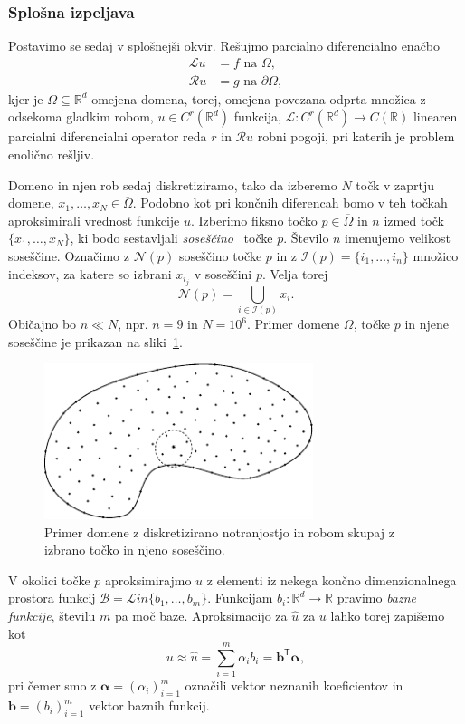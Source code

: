 \documentclass[12pt,a4paper]{article}
\theoremstyle{definition} %
\theoremstyle{plain} %
\newcommand{\R}{\mathbb R}
\newcommand{\Rc}{\mathcal{R}}
\newcommand{\Nc}{\mathcal{N}}
\newcommand{\I}{\mathcal{I}}
\newcommand{\B}{\mathcal{B}}
\renewcommand{\L}{\mathcal{L}}
\newcommand{\T}{\mathsf{T}}
\renewcommand{\b}{\boldsymbol}
\newcommand{\zomega}{\overline{\Omega}}
\newcommand{\Lin}{\mathcal{L}in}
\newcommand{\uh}{\hat{u}}
\newcommand{\ang}[1]{\text{(\textit{angl.} #1)}}
\begin{document}
\subsubsection{Splošna izpeljava}
\label{sec:splosna-izpeljava}
Postavimo se sedaj v splošnejši okvir.
Rešujmo parcialno diferencialno enačbo
\begin{align}
  \L u &= f \text{ na } \Omega, \label{eq:general-problem} \\
  \Rc u &= g \text{ na } \partial \Omega \nonumber,
\end{align}
kjer je $\Omega \subseteq \R^d$ omejena domena, torej, omejena povezana odprta
množica z odsekoma gladkim robom, $u \in C^r(\R^d)$ funkcija,
$\L\colon C^r(\R^d) \to C(\R)$ linearen
parcialni diferencialni operator reda $r$ in $\Rc u$ robni pogoji,
pri katerih je problem enolično rešljiv.

Domeno in njen rob sedaj diskretiziramo, tako da izberemo $N$ točk v zaprtju
domene, $x_1, \dots, x_N \in \zomega$. Podobno kot pri končnih
diferencah bomo v teh točkah aproksimirali vrednost funkcije $u$.
Izberimo fiksno točko $p \in \zomega$ in $n$ izmed točk $\{x_1, \dots, x_N\}$,
ki bodo sestavljali \emph{soseščino}~\ang{support} točke $p$. Število $n$ imenujemo
velikost soseščine. Označimo z $\Nc(p)$ soseščino točke $p$ in
z $\I(p) = \{i_1, \dots, i_n\}$ množico indeksov, za katere so izbrani
$x_{i_j}$ v soseščini $p$. Velja torej \[
  \Nc(p) = \bigcup_{i \in \I(p)} x_i.
\]
Običajno bo $n \ll N$, npr. $n = 9$ in $N = 10^6$.
Primer domene $\Omega$, točke $p$ in njene soseščine je prikazan na
sliki~\ref{fig:domain-example}.

\begin{figure}[ht]
  \centering
  \includegraphics[width=0.7\textwidth]{images/domain_theoretical.pdf}
  \caption{Primer domene z diskretizirano notranjostjo in robom skupaj z izbrano
  točko in njeno soseščino.}
  \label{fig:domain-example}
\end{figure}

V okolici točke $p$ aproksimirajmo $u$ z elementi iz nekega končno
dimenzionalnega prostora funkcij $\B = \Lin\{b_1, \dots, b_m\}$.
Funkcijam $b_i\colon \R^d \to \R$ pravimo \emph{bazne funkcije},
številu $m$ pa moč baze. Aproksimacijo za $\uh$ za $u$ lahko torej zapišemo kot
\[
  u \approx \uh = \sum_{i=1}^m \alpha_i b_i = \b{b}^\T \b{\alpha},
\]
pri čemer smo z $\b{\alpha} = (\alpha_i)_{i=1}^m$ označili vektor neznanih
koeficientov in $\b{b} = (b_i)_{i=1}^m$ vektor baznih funkcij.
\end{document}
